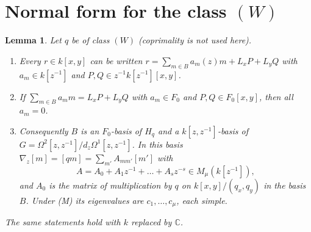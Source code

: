 \documentclass[11pt]{article}
\numberwithin{equation}{section}
\newtheorem{lemma}[theorem]{Lemma}
\theoremstyle{definition}
\theoremstyle{remark}
\newcommand{\C}{\mathbb C}\newcommand{\Q}{\mathbb Q}\newcommand{\R}{\mathbb R}\newcommand{\Z}{\mathbb Z}
\newcommand{\Hq}{H_q}
\begin{document}
\section{Normal form for the class \texorpdfstring{$(W)$}{(W)}}

\begin{lemma}\label{lem:normal}
Let $q$ be of class $(W)$ (coprimality is not used here).
\begin{enumerate}[label=\textup{(\alph*)},leftmargin=2.2em]
\item Every $r\in k[x,y]$ can be written
 $r=\sum_{m\in B}a_m(z)m+L_xP+L_yQ$ with $a_m\in k[z^{-1}]$ and
 $P,Q\in z^{-1}k[z^{-1}][x,y]$.
\item If $\sum_{m\in B}a_m m=L_xP+L_yQ$ with $a_m\in F_0$ and
 $P,Q\in F_0[x,y]$, then all $a_m=0$.
\item Consequently $B$ is an $F_0$-basis of $\Hq$ and a $k[z,z^{-1}]$-basis of
 $G=\Omega^2[z,z^{-1}]/d_z\Omega^1[z,z^{-1}]$. In this basis
 $\nabla_z[m]=[qm]=\sum_{m'}A_{mm'}[m']$ with
 \[
  A=A_0+A_1z^{-1}+\dots+A_sz^{-s}\in M_\mu(k[z^{-1}]),
 \]
 and $A_0$ is the matrix of multiplication by $q$ on
 $k[x,y]/(q_x,q_y)$ in the basis $B$. Under \textup{(M)} its eigenvalues are
 $c_1,\dots,c_\mu$, each simple.
\end{enumerate}
The same statements hold with $k$ replaced by $\C$.
\end{lemma}
\end{document}
